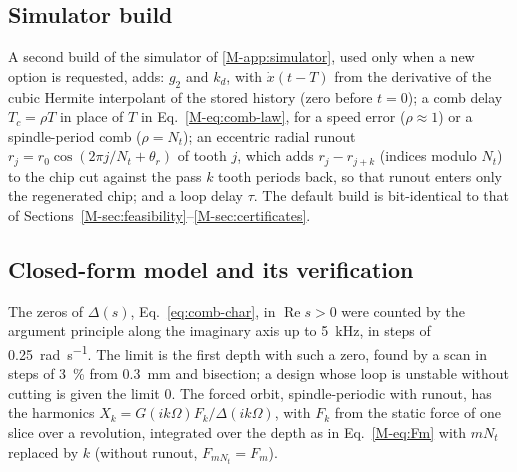 \subsection{Simulator build}\label{supp:delayed-sim}

A second build of the simulator of \ref{M-app:simulator}, used only when a new option is requested, adds: $g_2$ and $k_d$, with $\dot x(t-T)$ from the derivative of the cubic Hermite interpolant of the stored history (zero before $t=0$); a comb delay $T_c=\rho T$ in place of $T$ in Eq.~\eqref{M-eq:comb-law}, for a speed error ($\rho\approx1$) or a spindle-period comb ($\rho=N_t$); an eccentric radial runout $r_j=r_0\cos(2\pi j/N_t+\theta_r)$ of tooth $j$, which adds $r_j-r_{j+k}$ (indices modulo $N_t$) to the chip cut against the pass $k$ tooth periods back, so that runout enters only the regenerated chip; and a loop delay $\tau$. The default build is bit-identical to that of Sections~\ref{M-sec:feasibility}--\ref{M-sec:certificates}.

\subsection{Closed-form model and its verification}\label{supp:delayed-cf}

The zeros of $\Delta(s)$, Eq.~\eqref{eq:comb-char}, in $\operatorname{Re}s>0$ were counted by the argument principle along the imaginary axis up to \SI{5}{\kilo\hertz}, in steps of \SI{0.25}{\radian\per\second}. The limit is the first depth with such a zero, found by a scan in steps of \SI{3}{\percent} from \SI{0.3}{\milli\metre} and bisection; a design whose loop is unstable without cutting is given the limit 0. The forced orbit, spindle-periodic with runout, has the harmonics $X_k=G(ik\Omega)F_k/\Delta(ik\Omega)$, with $F_k$ from the static force of one slice over a revolution, integrated over the depth as in Eq.~\eqref{M-eq:Fm} with $mN_t$ replaced by $k$ (without runout, $F_{mN_t}=F_m$).

